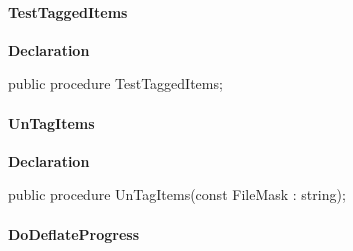 \documentclass{report}
\newif\ifpdf
\begin{document}
\paragraph*{TestTaggedItems}\hspace*{\fill}

\label{AbArcTyp.TAbArchive-TestTaggedItems}
\begin{list}{}{
\setlength{\itemindent}{0cm}
\setlength{\listparindent}{0cm}
\setlength{\leftmargin}{\evensidemargin}
\addtolength{\leftmargin}{\tmplength}
\settowidth{\labelsep}{X}
\addtolength{\leftmargin}{\labelsep}
\setlength{\labelwidth}{\tmplength}
}
\item[\textbf{Declaration}\hfill]
\ifpdf
\begin{flushleft}
\fi
\begin{ttfamily}
public procedure TestTaggedItems;\end{ttfamily}

\ifpdf
\end{flushleft}
\fi

\end{list}
\paragraph*{UnTagItems}\hspace*{\fill}

\label{AbArcTyp.TAbArchive-UnTagItems}
\begin{list}{}{
\setlength{\itemindent}{0cm}
\setlength{\listparindent}{0cm}
\setlength{\leftmargin}{\evensidemargin}
\addtolength{\leftmargin}{\tmplength}
\settowidth{\labelsep}{X}
\addtolength{\leftmargin}{\labelsep}
\setlength{\labelwidth}{\tmplength}
}
\item[\textbf{Declaration}\hfill]
\ifpdf
\begin{flushleft}
\fi
\begin{ttfamily}
public procedure UnTagItems(const FileMask : string);\end{ttfamily}

\ifpdf
\end{flushleft}
\fi

\end{list}
\paragraph*{DoDeflateProgress}\hspace*{\fill}
\end{document}
